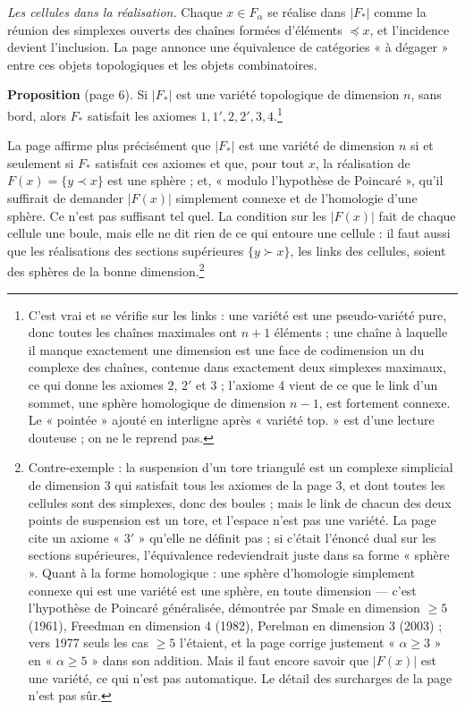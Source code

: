 \documentclass[11pt,a4paper]{article}
\begin{document}
\emph{Les cellules dans la réalisation.} Chaque $x \in F_\alpha$ se réalise
dans $|F_*|$ comme la réunion des simplexes ouverts des chaînes formées
d'éléments $\preceq x$, et l'incidence devient l'inclusion. La page annonce
une équivalence de catégories « à dégager » entre ces objets topologiques et
les objets combinatoires.

\textbf{Proposition} (page 6). Si $|F_*|$ est une variété topologique de
dimension $n$, sans bord, alors $F_*$ satisfait les axiomes $1, 1', 2, 2', 3,
4$.\footnote{C'est vrai et se vérifie sur les links : une variété est une
pseudo-variété pure, donc toutes les chaînes maximales ont $n+1$ éléments ;
une chaîne à laquelle il manque exactement une dimension est une face de
codimension un du complexe des chaînes, contenue dans exactement deux
simplexes maximaux, ce qui donne les axiomes $2$, $2'$ et $3$ ; l'axiome 4
vient de ce que le link d'un sommet, une sphère homologique de dimension
$n-1$, est fortement connexe. Le « pointée » ajouté en interligne après
« variété top. » est d'une lecture douteuse ; on ne le reprend pas.}

La page affirme plus précisément que $|F_*|$ est une variété de dimension $n$
si et seulement si $F_*$ satisfait ces axiomes et que, pour tout $x$, la
réalisation de $F(x) = \{y \prec x\}$ est une sphère ; et, « modulo
l'hypothèse de Poincaré », qu'il suffirait de demander $|F(x)|$ simplement
connexe et de l'homologie d'une sphère. Ce n'est pas suffisant tel quel. La
condition sur les $|F(x)|$ fait de chaque cellule une boule, mais elle ne
dit rien de ce qui entoure une cellule : il faut aussi que les réalisations
des sections supérieures $\{y \succ x\}$, les links des cellules, soient des
sphères de la bonne dimension.\footnote{Contre-exemple : la suspension d'un
tore triangulé est un complexe simplicial de dimension 3 qui satisfait tous
les axiomes de la page 3, et dont toutes les cellules sont des simplexes,
donc des boules ; mais le link de chacun des deux points de suspension est un
tore, et l'espace n'est pas une variété. La page cite un axiome « $3'$ »
qu'elle ne définit pas ; si c'était l'énoncé dual sur les sections
supérieures, l'équivalence redeviendrait juste dans sa forme « sphère ».
Quant à la forme homologique : une sphère d'homologie simplement connexe qui
est une variété est une sphère, en toute dimension --- c'est l'hypothèse de
Poincaré généralisée, démontrée par Smale en dimension $\geqslant 5$ (1961),
Freedman en dimension 4 (1982), Perelman en dimension 3 (2003) ; vers 1977
seuls les cas $\geqslant 5$ l'étaient, et la page corrige justement
« $\alpha \geqslant 3$ » en « $\alpha \geqslant 5$ » dans son addition. Mais il
faut encore savoir que $|F(x)|$ est une variété, ce qui n'est pas
automatique. Le détail des surcharges de la page n'est pas sûr.}
\end{document}
